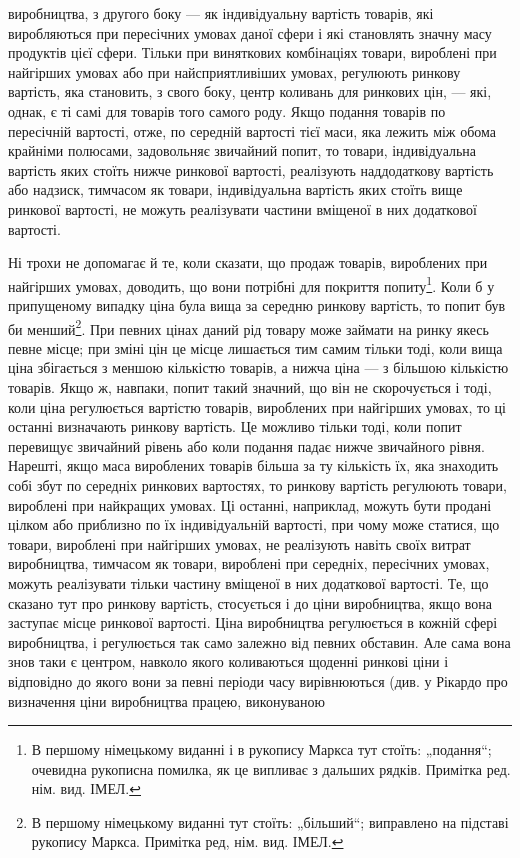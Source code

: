 \parcont{}  %
виробництва, з другого боку — як індивідуальну вартість товарів,
які виробляються при пересічних умовах даної сфери і які становлять
значну масу продуктів цієї сфери. Тільки при виняткових
комбінаціях товари, вироблені при найгірших умовах або
при найсприятливіших умовах, регулюють ринкову вартість, яка становить,
з свого боку, центр коливань для ринкових цін, —
які, однак, є ті самі для товарів того самого роду. Якщо подання
товарів по пересічній вартості, отже, по середній вартості
тієї маси, яка лежить між обома крайніми полюсами,
задовольняє звичайний попит, то товари, індивідуальна вартість
яких стоїть нижче ринкової вартості, реалізують наддодаткову
вартість або надзиск, тимчасом як товари, індивідуальна вартість
яких стоїть вище ринкової вартості, не можуть реалізувати
частини вміщеної в них додаткової вартості.

Ні трохи не допомагає й те, коли сказати, що продаж товарів,
вироблених при найгірших умовах, доводить, що вони
потрібні для покриття попиту\footnote*{
В першому німецькому виданні і в рукопису Маркса тут стоїть: „подання“;
очевидна рукописна помилка, як це випливає з дальших рядків. Примітка
ред. нім. вид. ІМЕЛ.
}. Коли б у припущеному випадку
ціна була вища за середню ринкову вартість, то попит був би
менший\footnote*{
В першому німецькому виданні тут стоїть: „більший“; виправлено на
підставі рукопису Маркса. Примітка ред, нім. вид. ІМЕЛ.
}. При певних цінах даний рід товару може займати
на ринку якесь певне місце; при зміні цін це місце лишається
тим самим тільки тоді, коли вища ціна збігається з меншою
кількістю товарів, а нижча ціна — з більшою кількістю товарів.
Якщо ж, навпаки, попит такий значний, що він не скорочується
і тоді, коли ціна регулюється вартістю товарів, вироблених при
найгірших умовах, то ці останні визначають ринкову вартість.
Це можливо тільки тоді, коли попит перевищує звичайний рівень
або коли подання падає нижче звичайного рівня. Нарешті,
якщо маса вироблених товарів більша за ту кількість їх, яка
знаходить собі збут по середніх ринкових вартостях, то ринкову
вартість регулюють товари, вироблені при найкращих
умовах. Ці останні, наприклад, можуть бути продані цілком або
приблизно по їх індивідуальній вартості, при чому може статися,
що товари, вироблені при найгірших умовах, не реалізують навіть
своїх витрат виробництва, тимчасом як товари, вироблені
при середніх, пересічних умовах, можуть реалізувати тільки частину
вміщеної в них додаткової вартості. Те, що сказано тут
про ринкову вартість, стосується і до ціни виробництва, якщо
вона заступає місце ринкової вартості. Ціна виробництва регулюється
в кожній сфері виробництва, і регулюється так само
залежно від певних обставин. Але сама вона знов таки є центром,
навколо якого коливаються щоденні ринкові ціни і відповідно
до якого вони за певні періоди часу вирівнюються (див.
у Рікардо про визначення ціни виробництва працею, виконуваною
\parbreak{}  %
